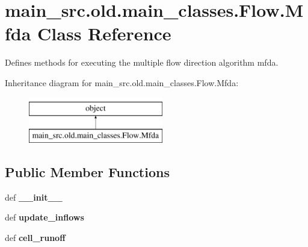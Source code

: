 \hypertarget{classmain__src_8old_1_1main__classes_1_1Flow_1_1Mfda}{\section{main\-\_\-src.\-old.\-main\-\_\-classes.\-Flow.\-Mfda Class Reference}
\label{classmain__src_8old_1_1main__classes_1_1Flow_1_1Mfda}
}


Defines methods for executing the multiple flow direction algorithm mfda.  


Inheritance diagram for main\-\_\-src.\-old.\-main\-\_\-classes.\-Flow.\-Mfda\-:\begin{figure}[H]
\begin{center}
\leavevmode
\includegraphics[height=2.000000cm]{classmain__src_8old_1_1main__classes_1_1Flow_1_1Mfda}
\end{center}
\end{figure}
\subsection*{Public Member Functions}
\begin{DoxyCompactItemize}
\item 
\hypertarget{classmain__src_8old_1_1main__classes_1_1Flow_1_1Mfda_a7c3d608153bdce419f5f112a631bc14e}{def {\bfseries \-\_\-\-\_\-init\-\_\-\-\_\-}}\label{classmain__src_8old_1_1main__classes_1_1Flow_1_1Mfda_a7c3d608153bdce419f5f112a631bc14e}

\item 
\hypertarget{classmain__src_8old_1_1main__classes_1_1Flow_1_1Mfda_ac8a97d4ac9b66f9ac343ecf7b548df54}{def {\bfseries update\-\_\-inflows}}\label{classmain__src_8old_1_1main__classes_1_1Flow_1_1Mfda_ac8a97d4ac9b66f9ac343ecf7b548df54}

\item 
\hypertarget{classmain__src_8old_1_1main__classes_1_1Flow_1_1Mfda_ab23f0fea1cba0e7f39484e57f2c152e0}{def {\bfseries cell\-\_\-runoff}}\label{classmain__src_8old_1_1main__classes_1_1Flow_1_1Mfda_ab23f0fea1cba0e7f39484e57f2c152e0}

\end{DoxyCompactItemize}
